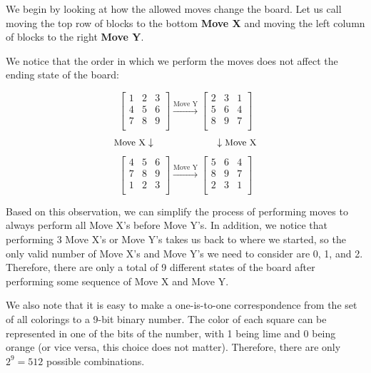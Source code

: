 \documentclass[12pt]{article}
\begin{document}
\begin{solution}{2}
    We begin by looking at how the allowed moves change the board. Let us call
    moving the top row of blocks to the bottom \textbf{Move X} and moving the
    left column of blocks to the right \textbf{Move Y}.
    
    We notice that the order in which we perform the moves does not affect the
    ending state of the board:
    
    $$
    \begin{bmatrix}
    1 & 2 & 3 \\
    4 & 5 & 6 \\
    7 & 8 & 9 \\
    \end{bmatrix}
    \overset{{\text{Move Y}}}{\to}
    \begin{bmatrix}
    2 & 3 & 1 \\
    5 & 6 & 4 \\
    8 & 9 & 7 \\
    \end{bmatrix}
    $$
    $$
    {\small{\text{Move X}}} \downarrow
    \phantom{
    \begin{bmatrix}
    1 & 2 & 3 & 4
    \end{bmatrix}
    }
    \downarrow {\small{\text{Move X}}}
    $$
    $$
    \begin{bmatrix}
    4 & 5 & 6 \\
    7 & 8 & 9 \\
    1 & 2 & 3 \\
    \end{bmatrix}
    \overset{{\text{Move Y}}}{\to}
    \begin{bmatrix}
    5 & 6 & 4\\
    8 & 9 & 7 \\
    2 & 3 & 1\\
    \end{bmatrix}
    $$
    
    Based on this observation, we can simplify the process of performing moves
    to always perform all Move X's before Move Y's. In addition, we notice that
    performing 3 Move X's or Move Y's takes us back to where we started, so the
    only valid number of Move X's and Move Y's we need to consider are 0, 1, and 2.
    Therefore, there are only a total of 9 different states of the board after
    performing some sequence of Move X and Move Y.
    
    We also note that it is easy to make a one-is-to-one correspondence from the
    set of all colorings to a 9-bit binary number. The color of each square can
    be represented in one of the bits of the number, with 1 being lime and 0 being
    orange (or vice versa, this choice does not matter). Therefore, there are only
    $2^9=512$ possible combinations.
    

\end{solution}
\end{document}
